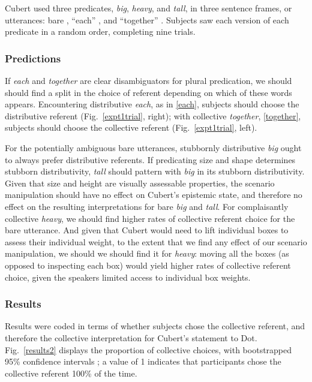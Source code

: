 \documentclass[linguex]{sp}
\begin{document}
 Cubert used three predicates, \emph{big}, \emph{heavy}, and \emph{tall}, in three sentence frames, or utterances: bare \Last[a], ``each'' \Last[b], and ``together'' \Last[c]. Subjects saw each version of each predicate in a random order, completing nine trials. 

\subsubsection{Predictions}

If \emph{each} and \emph{together} are clear disambiguators for plural predication, we should should find a split in the choice of referent depending on which of these words appears. Encountering distributive \emph{each}, as in \ref{each}, subjects should choose the distributive referent (Fig.~\ref{expt1trial}, right); with collective \emph{together}, \ref{together}, subjects should choose the collective referent (Fig.~\ref{expt1trial}, left). 

For the potentially ambiguous bare utterances, stubbornly distributive \emph{big} ought to always prefer distributive referents. If predicating size and shape determines stubborn distributivity, \emph{tall} should pattern with \emph{big} in its stubborn distributivity. Given that size and height are visually assessable properties, the scenario manipulation should have no effect on Cubert's epistemic state, and therefore no effect on the resulting interpretations for bare \emph{big} and \emph{tall}. For complaisantly collective \emph{heavy}, we should find higher rates of collective referent choice for the bare utterance. And given that Cubert would need to lift individual boxes to assess their individual weight, to the extent that we find any effect of our scenario manipulation, we should we should find it for \emph{heavy}: moving all the boxes (as opposed to inspecting each box) would yield higher rates of collective referent choice, given the speakers limited access to individual box weights.

\subsubsection{Results}

Results were coded in terms of whether subjects chose the collective referent, and therefore the collective interpretation for Cubert's statement to Dot. Fig.\ \ref{results2} displays the proportion of collective choices, with bootstrapped 95\% confidence intervals \citep{diciccioefron1996}; a value of 1 indicates that participants chose the collective referent 100\% of the time.
\end{document}
